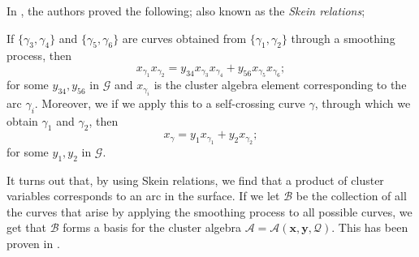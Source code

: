 In \cite{MW}, the authors proved the following; also known as the \emph{Skein relations};
\begin{theorem}\label{Skeinrelations}
    If $\{\gamma_3,\gamma_4\}$ and $\{\gamma_5,\gamma_6\}$ are curves obtained from $\{\gamma_1,\gamma_2\}$ through a smoothing process, then 
    \begin{equation*}
        x_{\gamma_1}x_{\gamma_2} = y_{34}x_{\gamma_3}x_{\gamma_4} + y_{56}x_{\gamma_5}x_{\gamma_6};
    \end{equation*}
    for some $y_{34},y_{56}$ in $\mathcal{G}$ and $x_{\gamma_i}$ is the cluster algebra element corresponding to the arc $\gamma_i$. Moreover, we  if we apply this to a self-crossing curve $\gamma$, through which we obtain $\gamma_1$ and $\gamma_2$, then
    \begin{equation*}
        x_{\gamma} = y_1x_{\gamma_1} + y_2x_{\gamma_2};
    \end{equation*}
    for some $y_1,y_2$ in $\mathcal{G}$. 
\end{theorem}
It turns out that, by using Skein relations, we find that a product of cluster variables corresponds to an arc in the surface. If we let $\mathcal{B}$ be the collection of all the curves that arise by applying the smoothing process to all possible curves, we get that $\mathcal{B}$ forms a basis for the cluster algebra $\mathcal{A} = \mathcal{A}(\mathbf{x},\mathbf{y},\mathcal{Q})$. This has been proven in \cite{MSW}.